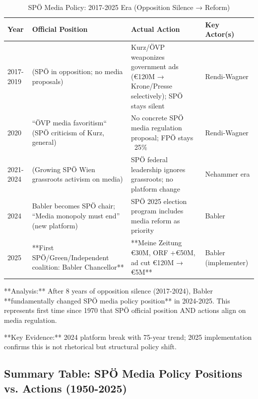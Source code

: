 \begin{table}[h]
\centering
\small
\caption{SPÖ Media Policy: 2017-2025 Era (Opposition Silence → Reform)}
\label{tab:bh-media-policy-2017-2025}
\begin{tabular}{|p{2.5cm}|p{3cm}|p{3cm}|p{4cm}|}
\hline
\textbf{Year} & \textbf{Official Position} & \textbf{Actual Action} & \textbf{Key Actor(s)} \\
\hline
2017-2019 & (SPÖ in opposition; no media proposals) & Kurz/ÖVP weaponizes government ads (€120M → Krone/Presse selectively); SPÖ stays silent & Rendi-Wagner \\
\hline
2020 & ``ÖVP media favoritism`` (SPÖ criticism of Kurz, general) & No concrete SPÖ media regulation proposal; FPÖ stays ~25\% & Rendi-Wagner \\
\hline
2021-2024 & (Growing SPÖ Wien grassroots activism on media) & SPÖ federal leadership ignores grassroots; no platform change & Nehammer era \\
\hline
2024 & Babler becomes SPÖ chair; ``Media monopoly must end'' (new platform) & SPÖ 2025 election program includes media reform as priority & Babler \\
\hline
2025 & **First SPÖ/Green/Independent coalition: Babler Chancellor** & **Meine Zeitung €30M, ORF +€50M, ad cut €120M → €5M** & Babler (implementer) \\
\hline
\end{tabular}
\end{table}

**Analysis:** After 8 years of opposition silence (2017-2024), Babler **fundamentally changed SPÖ media policy position**
in 2024-2025. This represents first time since 1970 that SPÖ official position AND actions align on media regulation.

**Key Evidence:** 2024 platform break with 75-year trend; 2025 implementation confirms this is not rhetorical but structural policy shift.

\subsection*{Summary Table: SPÖ Media Policy Positions vs. Actions (1950-2025)}

